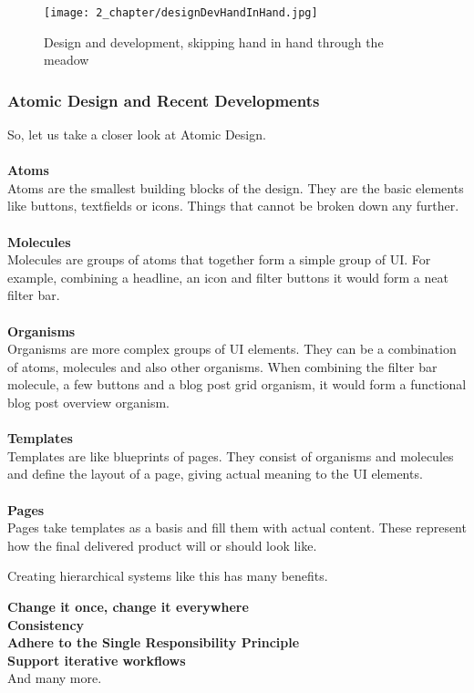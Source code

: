 \begin{figure}[h!]
    \begin{center}
        \texttt{[image: 2\_chapter/designDevHandInHand.jpg]}
        \caption[Caption (url)]{Design and development, skipping hand in hand through the meadow}
    \end{center}
\end{figure}

\subsubsection{Atomic Design and Recent Developments}
So, let us take a closer look at Atomic Design. \\\\
\textbf{Atoms} \\
Atoms are the smallest building blocks of the design. They are the basic elements like buttons,
textfields or icons. Things that cannot be broken down any further. \\\\
\textbf{Molecules} \\
Molecules are groups of atoms that together form a simple group of UI. For example, combining
a headline, an icon and filter buttons it would form a neat filter bar. \\\\
\textbf{Organisms} \\
Organisms are more complex groups of UI elements. They can be a combination of atoms, molecules and
also other organisms. When combining the filter bar molecule, a few buttons and a blog post grid
organism, it would form a functional blog post overview organism. \\\\
\textbf{Templates} \\
Templates are like blueprints of pages. They consist of organisms and molecules and define the
layout of a page, giving actual meaning to the UI elements. \\\\
\textbf{Pages}\\
Pages take templates as a basis and fill them with actual content. These represent how the final
delivered product will or should look like. \\

Creating hierarchical systems like this has many benefits.

\textbf{Change it once, change it everywhere}\\

\textbf{Consistency}\\

\textbf{Adhere to the Single Responsibility Principle}\\

\textbf{Support iterative workflows}\\

And many more.
